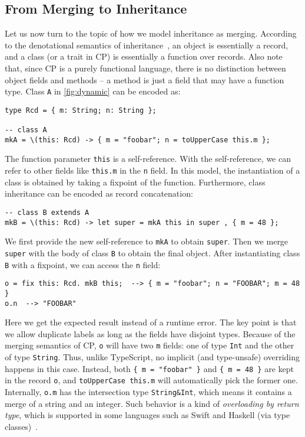 \subsection{From Merging to Inheritance} \label{sec:inheritance}

Let us now turn to the topic of how we model inheritance as merging. According
to the denotational semantics of inheritance~\citep{cook1989denotational}, an
object is essentially a record, and a class (or a trait in CP) is essentially a
function over records. Also note that, since CP is a purely functional language,
there is no distinction between object fields and methods -- a method is just a
field that may have a function type. Class \lstinline{A} in
\autoref{fig:dynamic} can be encoded as:
\begin{lstlisting}
type Rcd = { m: String; n: String };

-- class A
mkA = \(this: Rcd) -> { m = "foobar"; n = toUpperCase this.m };
\end{lstlisting}
The function parameter \lstinline{this} is a self-reference. With the
self-reference, we can refer to other fields like \lstinline{this.m} in the
\lstinline{n} field. In this model, the instantiation of a class is obtained by
taking a fixpoint of the function. Furthermore, class inheritance can be encoded
as record concatenation:
\begin{lstlisting}[deletekeywords=super]
-- class B extends A
mkB = \(this: Rcd) -> let super = mkA this in super , { m = 48 };
\end{lstlisting}
We first provide the new self-reference to \lstinline{mkA} to obtain
\lstinline[deletekeywords=super]{super}. Then we merge
\lstinline[deletekeywords=super]{super} with the body of class \lstinline{B} to
obtain the final object. After instantiating class \lstinline{B} with a
fixpoint, we can access the \lstinline{n} field:
\begin{lstlisting}
o = fix this: Rcd. mkB this;  --> { m = "foobar"; n = "FOOBAR"; m = 48 }
o.n  --> "FOOBAR"
\end{lstlisting}
Here we get the expected result instead of a runtime error. The key point is
that we allow duplicate labels as long as the fields have disjoint types.
Because of the merging semantics of CP, \lstinline{o} will have two
\lstinline{m} fields: one of type \lstinline{Int} and the other of type
\lstinline{String}. Thus, unlike TypeScript, no implicit (and type-unsafe)
overriding happens in this case. Instead, both \lstinline|{ m = "foobar" }| and
\lstinline|{ m = 48 }| are kept in the record \lstinline{o}, and
\lstinline{toUpperCase this.m} will automatically pick the former one.
Internally, \lstinline{o.m} has the intersection type \lstinline{String&Int},
which means it contains a merge of a string and an integer. Such behavior is a
kind of \emph{overloading by return type}, which is supported in some languages
such as Swift and Haskell (via type classes)~\citep{marntirosian2020resolution}.

